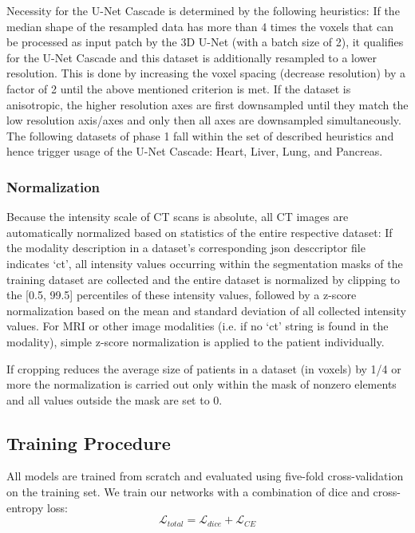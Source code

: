\documentclass{templates/llncs} %
\begin{document}
    Necessity for the U-Net Cascade is determined by the following heuristics: If the median shape of the resampled data has more than 4 times the voxels that can be processed as input patch by the 3D U-Net (with a batch size of 2), it qualifies for the U-Net Cascade and this dataset is additionally resampled to a lower resolution. This is done by increasing the voxel spacing (decrease resolution) by a factor of 2 until the above mentioned criterion is met. If the dataset is anisotropic, the higher resolution axes are first downsampled until they match the low resolution axis/axes and only then all axes are downsampled simultaneously. The following datasets of phase 1 fall within the set of described heuristics and hence trigger usage of the U-Net Cascade: Heart, Liver, Lung, and Pancreas.
    
    \subsubsection{Normalization}
    Because the intensity scale of CT scans is absolute, all CT images are automatically normalized based on statistics of the entire respective dataset: If the modality description in a dataset's corresponding json desccriptor file indicates `ct', all intensity values occurring within the segmentation masks of the training dataset are collected and the entire dataset is normalized by clipping to the [0.5, 99.5] percentiles of these intensity values, followed by a z-score normalization based on the mean and standard deviation of all collected intensity values. For MRI or other image modalities (i.e. if no `ct' string is found in the modality), simple z-score normalization is applied to the patient individually.
    
    If cropping reduces the average size of patients in a dataset (in voxels) by 1/4 or more the normalization is carried out only within the mask of nonzero elements and all values outside the mask are set to 0.
    
    
    
    \subsection{Training Procedure}
    All models are trained from scratch and evaluated using five-fold cross-validation on the training set. We train our networks with a combination of dice and cross-entropy loss:
    \begin{equation}
        \mathcal{L}_{total} = \mathcal{L}_{dice} + \mathcal{L}_{CE}
    \end{equation}
    
\end{document}
